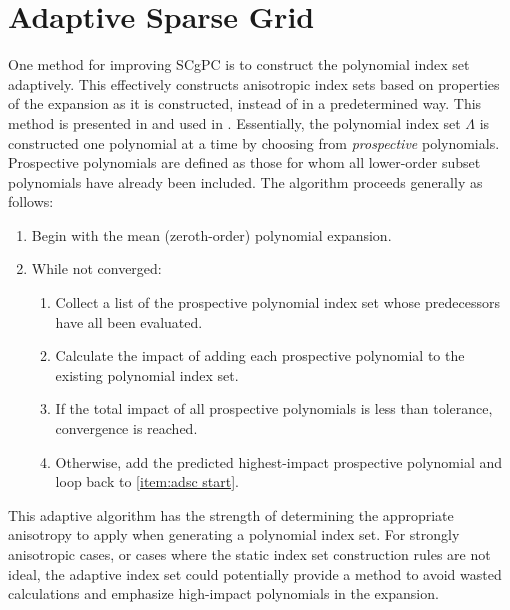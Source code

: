 \section{Adaptive Sparse Grid}\label{sec:adaptive sparse grid}
One method for improving SCgPC is to construct the polynomial index set adaptively.  This effectively
constructs anisotropic index sets based on properties of the expansion as it is constructed, instead of in a
predetermined way.  This method is presented in \cite{Gerstner} and used in \cite{Ayres}.  
Essentially, the polynomial index set $\Lambda$ is constructed one polynomial at a time by choosing from
\emph{prospective} polynomials.  Prospective polynomials are defined as those for whom all lower-order subset
polynomials have already been included.
The algorithm
proceeds generally as follows:
\begin{enumerate}
  \item Begin with the mean (zeroth-order) polynomial expansion.
  \item While not converged:
    \begin{enumerate}
      \item Collect a list of the prospective polynomial index set whose predecessors have all been evaluated.
        \label{item:adsc start}
      \item Calculate the impact of adding each prospective polynomial to the existing polynomial index set.
        \label{item:calc impact}
      \item If the total impact of all prospective polynomials is less than tolerance, convergence is reached.
      \item Otherwise, add the predicted highest-impact prospective polynomial and loop back to \ref{item:adsc
        start}.
    \end{enumerate}
\end{enumerate}
This adaptive algorithm has the strength of determining the appropriate anisotropy to apply when generating a
polynomial index set.  For strongly  anisotropic cases, or cases where the static index set construction rules are not
ideal, the adaptive index set could potentially provide a method to avoid wasted calculations and emphasize
high-impact polynomials in the expansion.

